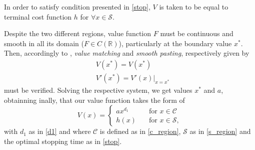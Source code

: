 In order to satisfy condition presented in \eqref{stop}, $V$ is taken to be equal to terminal cost function $h$ for $\forall x \in \mathcal{S}$.

Despite the two different regions, value function $F$ must be continuous and smooth in all its domain ($F\in C(\mathds{R})$), particularly at the boundary value $x^*$. Then, accordingly to \cite{dixit:book}, \textit{value matching} and \textit{smooth pasting}, respectively given by
\begin{subequations}
	\label{eq:vm+sp}
	\begin{align}
	&V(x^*)=V(x^*) \label{valuematch}\\
	&V'(x^*)=V'(x)|_{x=x^*} \label{smoothpasting}
	\end{align}
\end{subequations}
must be verified. Solving the respective system, we get values $x^*$ and $a$, obtainning inally, that our value function takes the form of
$$V(x)=\begin{cases} ax^{d_1} &\quad \text{for } x\in \mathcal{C} \\
h(x)  &\quad \text{for } x\in \mathcal{S},
\end{cases}$$
with $d_1$ as in \eqref{d1} and where $\mathcal{C}$ is defined as in \eqref{c_region}, $\mathcal{S}$ as in \eqref{s_region} and the optimal stopping time as in \eqref{stop}.







